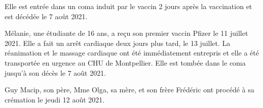 Elle est entrée dans un coma induit par le vaccin 2 jours après la vaccination
et est décédée le 7 août 2021.

Mélanie, une étudiante de 16 ans, a reçu son premier vaccin Pfizer le 11 juillet
2021. Elle a fait un arrêt cardiaque deux jours plus tard, le 13 juillet. La
réanimation et le massage cardiaque ont été immédiatement entrepris et elle a
été transportée en urgence au CHU de Montpellier. Elle est tombée dans le coma
jusqu'à son décès le 7 août 2021.

Guy Macip, son père, Mme Olga, sa mère, et son frère Frédéric ont procédé à sa
crémation le jeudi 12 août 2021.
